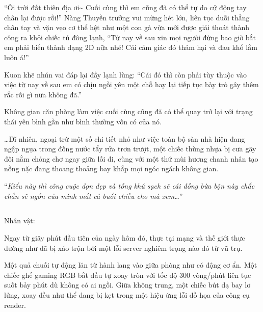 \documentclass[../main.tex]{subfiles}
\begin{document}
``Ôi trời đất thiên địa ơi\~{} Cuối cùng thì em cũng đã có thể tự do cử động tay chân lại được rồi!'' Nàng Thuyền trưởng vui mừng hét lớn, liên tục duỗi thẳng chân tay và vặn vẹo cơ thể hệt như một con gà vừa mới được giải thoát thành công ra khỏi chiếc tủ đông lạnh, ``Từ nay về sau xin mọi người đừng bao giờ bắt em phải biến thành dạng 2D nữa nhé! Cái cảm giác đó thảm hại và đau khổ lắm luôn á!''

Kuon khẽ nhún vai đáp lại đầy lạnh lùng: ``Cái đó thì còn phải tùy thuộc vào việc từ nay về sau em có chịu ngồi yên một chỗ hay lại tiếp tục bày trò gây thêm rắc rối gì nữa không đã.''

Không gian căn phòng làm việc cuối cùng cũng đã có thể quay trở lại với trạng thái yên bình gần như bình thường vốn có của nó.

\dots Dĩ nhiên, ngoại trừ một số chi tiết nhỏ như việc toàn bộ sàn nhà hiện đang ngập ngụa trong đống nước tẩy rửa trơn trượt, một chiếc thùng nhựa bị cưa gãy đôi nằm chỏng chơ ngay giữa lối đi, cùng với một thứ mùi hương chanh nhân tạo nồng nặc đang thoang thoảng bay khắp mọi ngóc ngách không gian.

``\textit{Kiểu này thì công cuộc dọn dẹp và tống khứ sạch sẽ cái đống bừa bộn này chắc chắn sẽ ngốn của mình mất cả buổi chiều cho mà xem\dots}''

\newpage

\subsection*{\label{ep-C2.VI}}
\begin{center}
  {\caviar\fontsize{12pt}{12pt}\selectfont Nhân vật:                    }
\end{center}

Ngay từ giây phút đầu tiên của ngày hôm đó, thực tại mạng và thế giới thực dường như đã bị xáo trộn bởi một lỗi server nghiêm trọng nào đó từ vũ trụ.

Một quả chuối tự động lăn từ hành lang vào giữa phòng như có động cơ ẩn. Một chiếc ghế gaming RGB bắt đầu tự xoay tròn với tốc độ 300 vòng/phút liên tục suốt bảy phút dù không có ai ngồi. Giữa không trung, một chiếc bút dạ bay lơ lửng, xoay đều như thể đang bị kẹt trong một hiệu ứng lỗi đồ họa của công cụ render.
\end{document}
